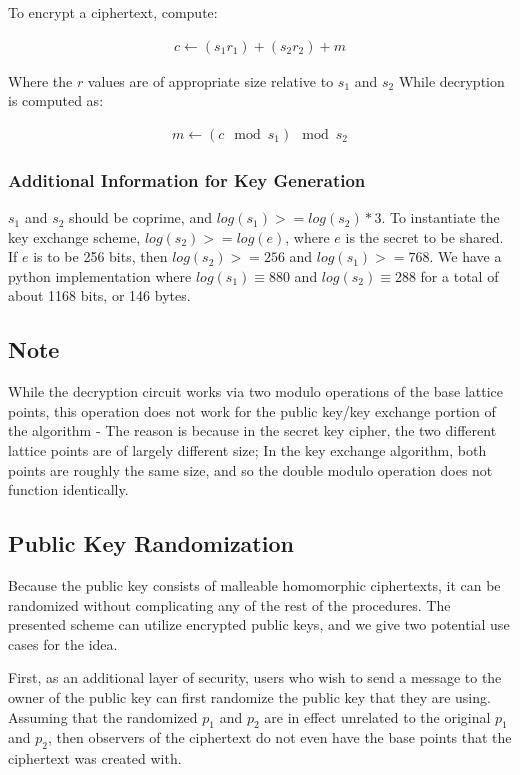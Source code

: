 \documentclass[preprint]{iacrtrans}
\begin{document}
To encrypt a ciphertext, compute:

\begin{align}
   c \gets (s_1 r_1) + (s_2 r_2) + m
\end{align}

Where the $r$ values are of appropriate size relative to $s_1$ and $s_2$ 
While decryption is computed as:

\begin{align}
    m \gets (c \mod s_1) \mod s_2
\end{align}

\subsubsection{Additional Information for Key Generation}
$s_1$ and $s_2$ should be coprime, and $log(s_1) >= log(s_2) * 3$. To instantiate the key exchange scheme, $log(s_2) >= log(e)$, where $e$ is the secret to be shared. If $e$ is to be 256 bits, then $log(s_2) >= 256$ and $log(s_1) >= 768$. We have a python implementation where $log(s_1) \equiv 880$ and $log(s_2) \equiv 288$ for a total of about 1168 bits, or 146 bytes. 

\subsection{Note}
While the decryption circuit works via two modulo operations of the base lattice points, this operation does not work for the public key/key exchange portion of the algorithm - The reason is because in the secret key cipher, the two different lattice points are of largely different size; In the key exchange algorithm, both points are roughly the same size, and so the double modulo operation does not function identically.

\subsection{Public Key Randomization}
Because the public key consists of malleable homomorphic ciphertexts, it can be randomized without complicating any of the rest of the procedures. The presented scheme can utilize encrypted public keys, and we give two potential use cases for the idea.

First, as an additional layer of security, users who wish to send a message to the owner of the public key can first randomize the public key that they are using. Assuming that the randomized $p_1$ and $p_2$ are in effect unrelated to the original $p_1$ and $p_2$, then observers of the ciphertext do not even have the base points that the ciphertext was created with.
\end{document}
